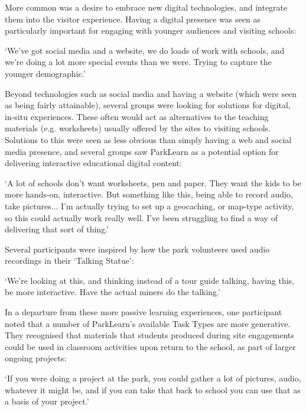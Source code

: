 More common was a desire to embrace new digital technologies, and integrate them into the visitor experience. Having a digital presence was seen as particularly important for engaging with younger audiences and visiting schools:

\begin{displayquote}
`We've got social media and a website, we do loads of work with schools, and we're doing a lot more special events than we were. Trying to capture the younger demographic.'
\end{displayquote}

Beyond technologies such as social media and having a website (which were seen as being fairly attainable), several groups were looking for solutions for digital, in-situ experiences. These often would act as alternatives to the teaching materials (e.g. worksheets) usually offered by the sites to visiting schools. Solutions to this were seen as less obvious than simply having a web and social media presence, and several groups saw ParkLearn as a potential option for delivering interactive educational digital content:

\begin{displayquote}
`A lot of schools don't want worksheets, pen and paper. They want the kids to be more hands-on, interactive. But something like this, being able to record audio, take pictures... I'm actually trying to set up a geocaching, or map-type activity, so this could actually work really well. I've been struggling to find a way of delivering that sort of thing.'
\end{displayquote}

Several participants were inspired by how the park volunteers used audio recordings in their `Talking Statue':

\begin{displayquote}
`We're looking at this, and thinking instead of a tour guide talking, having this, be more interactive. Have the actual miners do the talking.'
\end{displayquote}

In a departure from these more passive learning experiences, one participant noted that a number of ParkLearn's available Task Types are more generative. They recognised that materials that students produced during site engagements could be used in classroom activities upon return to the school, as part of larger ongoing projects:

\begin{displayquote}
`If you were doing a project at the park, you could gather a lot of pictures, audio, whatever it might be, and if you can take that back to school you can use that as a basis of your project.'
\end{displayquote}

